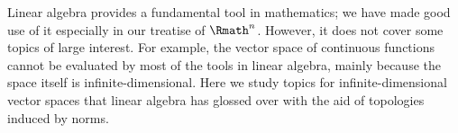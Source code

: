 \label{part:tvs}

Linear algebra provides a fundamental tool in mathematics;
we have made good use of it especially in our treatise of \(\Rmath^n\).
However, it does not cover some topics of large interest.
For example, the vector space of continuous functions
cannot be evaluated by most of the tools in linear algebra,
mainly because the space itself is infinite-dimensional.
Here we study topics for infinite-dimensional vector spaces
that linear algebra has glossed over with the aid of
topologies induced by norms.